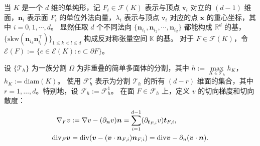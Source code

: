 当 $K$ 是一个 $d$ 维的单纯形，记 $F_i\in\mathcal F(K)$ 表示与顶点 $\texttt{v}_i$
对立的 $(d-1)$ 维面，$\boldsymbol n_i$ 表示面 $F_i$ 的单位外法向量，$\lambda_i$
表示与顶点 $\texttt{v}_i$ 对应的点 $\boldsymbol x$ 的重心坐标，其中 $i=0, 1,
\cdots, d$。
显然任取 $d$ 个不同法向 $\{\boldsymbol n_{i_1}, \boldsymbol n_{i_2}, \cdots,
\boldsymbol n_{i_d} \}$ 
都能构成 $\mathbb R^d$ 的基，
$\{\mathrm{skw}({\boldsymbol n_{i_k}\boldsymbol n_{i_l}^{\intercal}})\}_{1\leq
k<l\leq d}$ 构成反对称张量空间 $\mathbb K$ 的基。
对于 $F\in\mathcal F(K)$，令 $\mathcal{E}(F):=\{e\in\mathcal{E}(K): e\subset\partial F\}$。

设 $\{\mathcal {T}_h\}$ 为一族分割 $\Omega$ 为非重叠的简单多面体的分割，其中 $h:=\max\limits_{K\in \mathcal {T}_h}h_K$，
$h_K:=\mbox{diam}(K)$。
使用 $\mathcal F_h^r$ 表示为分割 $\mathcal T_h$ 的所有 $(d-r)$ 维面的集合，其中
$r=1,\ldots,d$。特别地，设 $\mathcal F_h:=\mathcal F_h^1$。
在面 $F\in\mathcal F_h$ 上，定义 $v$ 的切向梯度和切向散度：
$$
\begin{aligned}
    \nabla_F v&:=\nabla v-(\partial_{\boldsymbol{n}} v)\boldsymbol{n} = 
    \sum_{i=1}^{d-1}(\partial_{\boldsymbol{t}_{F, i}}v)\boldsymbol{t}_{F, i},\\
\mathrm{div}_F\boldsymbol{v} &
=\mathrm{div}(\boldsymbol{v}-(\boldsymbol{v}\cdot\boldsymbol{n}_{F,
i})\boldsymbol{n}_{F, i})=\mathrm{div}\boldsymbol{v}-\partial_n(\boldsymbol{v}\cdot\boldsymbol{n}).
\end{aligned}
$$

